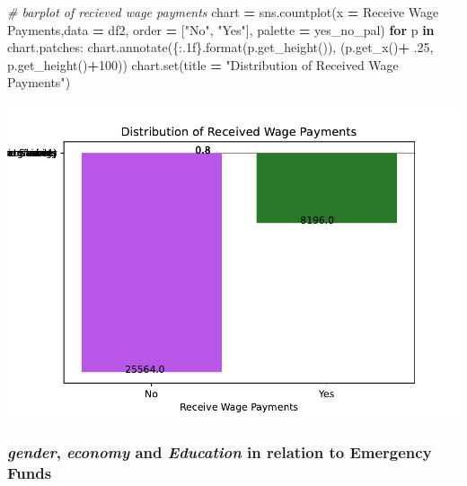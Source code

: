 \documentclass[water,article,submit,moreauthors,pdftex]{mdpi}
\newenvironment{Shaded}{\begin{snugshade}}{\end{snugshade}}
\newcommand{\BuiltInTok}[1]{#1}
\newcommand{\CommentTok}[1]{\textcolor[rgb]{0.56,0.35,0.01}{\textit{#1}}}
\newcommand{\ControlFlowTok}[1]{\textcolor[rgb]{0.13,0.29,0.53}{\textbf{#1}}}
\newcommand{\DecValTok}[1]{\textcolor[rgb]{0.00,0.00,0.81}{#1}}
\newcommand{\FloatTok}[1]{\textcolor[rgb]{0.00,0.00,0.81}{#1}}
\newcommand{\KeywordTok}[1]{\textcolor[rgb]{0.13,0.29,0.53}{\textbf{#1}}}
\newcommand{\NormalTok}[1]{#1}
\newcommand{\OperatorTok}[1]{\textcolor[rgb]{0.81,0.36,0.00}{\textbf{#1}}}
\newcommand{\SpecialCharTok}[1]{\textcolor[rgb]{0.00,0.00,0.00}{#1}}
\newcommand{\StringTok}[1]{\textcolor[rgb]{0.31,0.60,0.02}{#1}}
\begin{document}
\begin{Shaded}
\begin{Highlighting}[]
\CommentTok{\# barplot of recieved wage payments}
\NormalTok{chart }\OperatorTok{=}\NormalTok{ sns.countplot(x }\OperatorTok{=} \StringTok{\textquotesingle{}Receive Wage Payments\textquotesingle{}}\NormalTok{,data }\OperatorTok{=}\NormalTok{ df2, order }\OperatorTok{=}\NormalTok{ [}\StringTok{"No"}\NormalTok{, }\StringTok{"Yes"}\NormalTok{], palette }\OperatorTok{=}\NormalTok{ yes\_no\_pal)}
\ControlFlowTok{for}\NormalTok{ p }\KeywordTok{in}\NormalTok{ chart.patches:}
\NormalTok{   chart.annotate(}\StringTok{\textquotesingle{}}\SpecialCharTok{\{:.1f\}}\StringTok{\textquotesingle{}}\NormalTok{.}\BuiltInTok{format}\NormalTok{(p.get\_height()), (p.get\_x()}\OperatorTok{+} \FloatTok{.25}\NormalTok{, p.get\_height()}\OperatorTok{+}\DecValTok{100}\NormalTok{))}
\NormalTok{chart.}\BuiltInTok{set}\NormalTok{(title }\OperatorTok{=} \StringTok{"Distribution of Received Wage Payments"}\NormalTok{)}
\end{Highlighting}
\end{Shaded}

\includegraphics{term_paper_files/figure-latex/unnamed-chunk-16-13.pdf}

\hypertarget{gender-economy-and-education-in-relation-to-emergency-funds}{%
\subsubsection{\texorpdfstring{\emph{gender}, \emph{economy} and
\emph{Education} in relation to Emergency
Funds}{gender, economy and Education in relation to Emergency Funds}}\label{gender-economy-and-education-in-relation-to-emergency-funds}}
\end{document}
